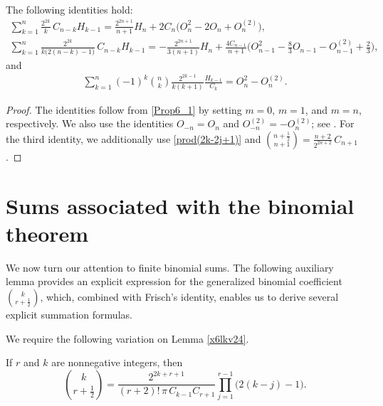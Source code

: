 \documentclass[12pt,reqno]{article}
\begin{document}
\begin{corollary} 
The following identities hold:
	\begin{gather*}
	\sum_{k = 1}^n \frac{2^{2k}}{k}\,C_{n - k} H_{k-1} = \frac{2^{2n + 1}}{n + 1} H_{n} + 2C_n\big( O^2_{n} - 2O_{n} + O^{(2)}_{n}\big),\\
	\sum_{k = 1}^{n} \frac{2^{2k}}{k\big(2(n-k)-1\big)}\,C_{n-k} H_{k-1} = - \frac{2^{2n+1}}{3(n+1)}H_n + \frac{4C_{n-1}}{n+1}
	\Big( O^2_{n-1} - \frac83 O_{n-1} -  O^{(2)}_{n-1} + \frac23 \Big), 
  \end{gather*}
 and 
  \begin{gather*}
  \sum_{k = 1}^{n} (-1)^k\binom{n}{k}\frac{2^{2k-1}}{k(k+1)}\frac{H_{k-1}}{C_k} = O^2_{n} - O^{(2)}_{n}.	
\end{gather*}
\end{corollary}
\begin{proof}
	The identities follow from \eqref{Prop6_1} by setting $m=0$, $m=1$, and $m=n$, respectively. We also use the identities $O_{-n}=O_n$ and  $O^{(2)}_{-n}=-O^{(2)}_n$; see \cite{KA_Cubic}. For the third identity, we additionally use \eqref{prod(2k-2j+1)} and $ \binom{n+\frac12}{n+1} = \frac{n+2}{2^{2n+2}}\,C_{n+1}$.
\end{proof}



\section{Sums associated with the binomial theorem}


We now turn our attention to finite binomial sums. The following auxiliary lemma provides an explicit expression for the generalized binomial coefficient $\binom{k}{r+\frac12}$, which, combined with Frisch's identity, enables us to derive several explicit summation formulas.

We require the following variation on Lemma \ref{x6lkv24}.
\begin{lemma}\label{Lem5}
If $r$ and $k$ are nonnegative integers, then
\begin{equation}\label{n2c8e0k}
\binom{k}{r+\frac12} = \frac{2^{2k+r+1}}{(r+2)!\,\pi\,C_{k-1}C_{r+1}} \prod_{j=1}^{r-1}\big(2(k-j)-1\big).
\end{equation}
\end{lemma}
\end{document}
